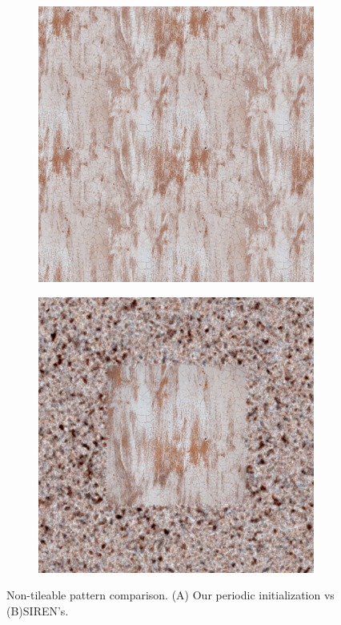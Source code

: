 \begin{figure}[!h]
    \centering
      \begin{subfigure}{0.30\textwidth}
        \includegraphics[width=\linewidth]{img/ch6/comparisons/mnet_grad_border.png}
        \caption{}
      \end{subfigure}
      \begin{subfigure}{0.30\textwidth}
        \includegraphics[width=\linewidth]{img/ch6/comparisons/siren_grad_border.png}
        \caption{}
      \end{subfigure}
    \caption{Non-tileable pattern comparison. (A) Our periodic initialization vs (B)SIREN's.} 
    \label{f:comparison_siren_nontileable}
\end{figure}


